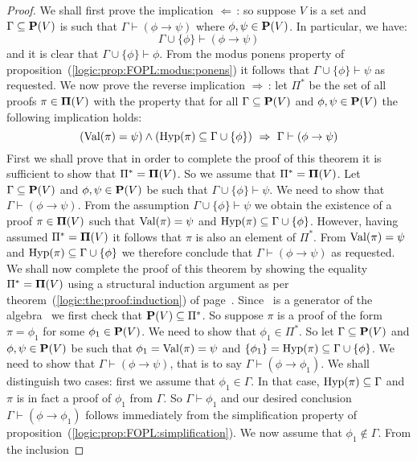 \begin{proof}
We shall first prove the implication $\Leftarrow$\,: so suppose $V$
is a set and $\Gamma\subseteq\mbox{${\bf P}(V)$}$ is such that
$\Gamma\vdash(\phi\to\psi)$ where $\phi,\psi\in\mbox{${\bf P}(V)$}$. In particular,
we have:
    \[
    \Gamma\cup\{\phi\}\vdash(\phi\to\psi)
    \]
and it is clear that $\Gamma\cup\{\phi\}\vdash\phi$. From the modus
ponens property of proposition~(\ref{logic:prop:FOPL:modus:ponens})
it follows that $\Gamma\cup\{\phi\}\vdash\psi$ as requested. We now
prove the reverse implication $\Rightarrow$\,: let $\Pi^{*}$ be the
set of all proofs $\pi\in\mbox{${\bf\Pi}(V)$}$ with the property that for all
$\Gamma\subseteq\mbox{${\bf P}(V)$}$ and $\phi,\psi\in\mbox{${\bf P}(V)$}$ the following implication
holds:
    \[
    (\mbox{\rm Val}(\pi)=\psi)\land(\mbox{\rm Hyp}(\pi)\subseteq\Gamma\cup\{\phi\})\
    \Rightarrow\ \Gamma\vdash(\phi\to\psi)
    \]
First we shall prove that in order to complete the proof of this
theorem it is sufficient to show that $\Pi^{*}=\mbox{${\bf\Pi}(V)$}$. So we assume
that $\Pi^{*}=\mbox{${\bf\Pi}(V)$}$. Let $\Gamma\subseteq\mbox{${\bf P}(V)$}$ and $\phi,\psi\in\mbox{${\bf P}(V)$}$
be such that $\Gamma\cup\{\phi\}\vdash\psi$. We need to show that
$\Gamma\vdash(\phi\to\psi)$. From the assumption
$\Gamma\cup\{\phi\}\vdash\psi$ we obtain the existence of a proof
$\pi\in\mbox{${\bf\Pi}(V)$}$ such that $\mbox{\rm Val}(\pi) = \psi$ and
$\mbox{\rm Hyp}(\pi)\subseteq\Gamma\cup\{\phi\}$. However, having assumed
$\Pi^{*} = \mbox{${\bf\Pi}(V)$}$ it follows that $\pi$ is also an element of
$\Pi^{*}$. From $\mbox{\rm Val}(\pi) = \psi$ and
$\mbox{\rm Hyp}(\pi)\subseteq\Gamma\cup\{\phi\}$ we therefore conclude that
$\Gamma\vdash(\phi\to\psi)$ as requested. We shall now complete the
proof of this theorem by showing the equality $\Pi^{*}=\mbox{${\bf\Pi}(V)$}$ using a
structural induction argument as per
theorem~(\ref{logic:the:proof:induction}) of
page~\pageref{logic:the:proof:induction}. Since \pv\ is a generator
of the algebra \pvs\ we first check that $\mbox{${\bf P}(V)$}\subseteq\Pi^{*}$. So
suppose $\pi$ is a proof of the form $\pi=\phi_{1}$ for some
$\phi_{1}\in\mbox{${\bf P}(V)$}$. We need to show that $\phi_{1}\in\Pi^{*}$. So let
$\Gamma\subseteq\mbox{${\bf P}(V)$}$ and $\phi,\psi\in\mbox{${\bf P}(V)$}$ be such that
$\phi_{1}=\mbox{\rm Val}(\pi)=\psi$ and
$\{\phi_{1}\}=\mbox{\rm Hyp}(\pi)\subseteq\Gamma\cup\{\phi\}$. We need to show
that $\Gamma\vdash(\phi\to\psi)$, that is to say
$\Gamma\vdash(\phi\to\phi_{1})$. We shall distinguish two cases:
first we assume that $\phi_{1}\in\Gamma$. In that case,
$\mbox{\rm Hyp}(\pi)\subseteq\Gamma$ and $\pi$ is in fact a proof of
$\phi_{1}$ from $\Gamma$. So $\Gamma\vdash\phi_{1}$ and our desired
conclusion $\Gamma\vdash(\phi\to\phi_{1})$ follows immediately from
the simplification property of
proposition~(\ref{logic:prop:FOPL:simplification}). We now assume
that $\phi_{1}\not\in\Gamma$. From the inclusion

\end{proof}
